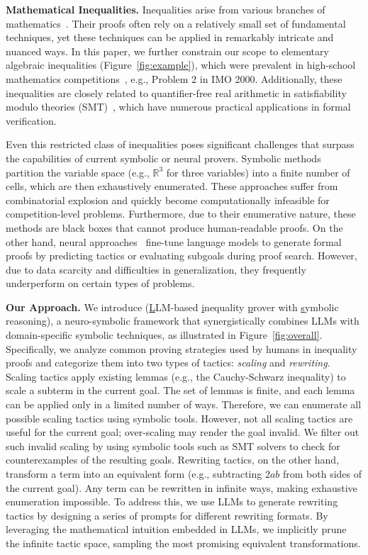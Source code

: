 \textbf{Mathematical Inequalities.}
Inequalities arise from various branches of mathematics~\citep{hardy1952inequalities}. 
Their proofs often rely on a relatively small set of fundamental techniques, yet these techniques can be applied in remarkably intricate and nuanced ways. In this paper, we further constrain our scope to elementary algebraic inequalities (Figure~\ref{fig:example}), which were prevalent in high-school mathematics competitions~\citep{manfrino2010inequalities}, e.g., Problem 2 in IMO 2000. Additionally, these inequalities are closely related to quantifier-free real arithmetic in satisfiability modulo theories (SMT)~\citep{barrett2018satisfiability}, which have numerous practical applications in formal verification.

Even this restricted class of inequalities poses significant challenges that surpass the capabilities of current symbolic or neural provers. Symbolic methods~\citep{yang1999recent, uray2020proving} partition the variable space (e.g., $\mathbb{R}^3$ for three variables) into a finite number of cells, which are then exhaustively enumerated. These approaches suffer from combinatorial explosion and quickly become computationally infeasible for competition-level problems. Furthermore, due to their enumerative nature, these methods are black boxes that cannot produce human-readable proofs. On the other hand, neural approaches~\citep{wu2021int, wei2024proving} fine-tune language models to generate formal proofs by predicting tactics or evaluating subgoals during proof search. However, due to data scarcity and difficulties in generalization, they frequently underperform on certain types of problems.

\textbf{Our Approach.} We introduce \name (\underline{L}LM-based \underline{i}nequality \underline{p}rover with \underline{s}ymbolic reasoning), a neuro-symbolic framework that synergistically combines LLMs with domain-specific symbolic techniques, as illustrated in Figure~\ref{fig:overall}. Specifically, we analyze common proving strategies used by humans in inequality proofs and categorize them into two types of tactics: \textit{scaling} and \textit{rewriting}. Scaling tactics apply existing lemmas (e.g., the Cauchy-Schwarz inequality) to scale a subterm in the current goal. The set of lemmas is finite, and each lemma can be applied only in a limited number of ways. Therefore, we can enumerate all possible scaling tactics using symbolic tools. However, not all scaling tactics are useful for the current goal; over-scaling may render the goal invalid. We filter out such invalid scaling by using symbolic tools such as SMT solvers to check for counterexamples of the resulting goals. Rewriting tactics, on the other hand, transform a term into an equivalent form (e.g., subtracting $2ab$ from both sides of the current goal). Any term can be rewritten in infinite ways, making exhaustive enumeration impossible. To address this, we use LLMs to generate rewriting tactics by designing a series of prompts for different rewriting formats. By leveraging the mathematical intuition embedded in LLMs, we implicitly prune the infinite tactic space, sampling the most promising equivalent transformations.

